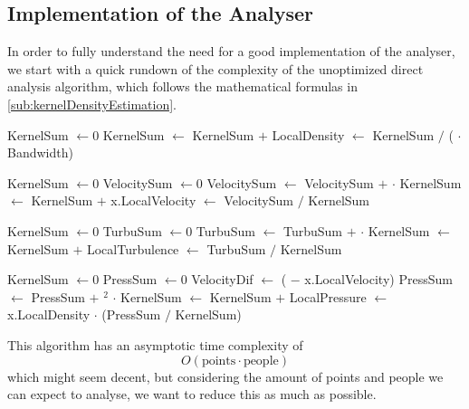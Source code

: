 \subsection{Implementation of the Analyser}\label{s3:analyser_implementation}

In order to fully understand the need for a good implementation of the analyser, we start with a quick rundown of the complexity of the unoptimized direct analysis algorithm, which follows the mathematical formulas in \cref{sub:kernelDensityEstimation}.

\begin{algorithmic}[1]

    \State KernelSum $\gets 0$
        \State KernelSum $\gets$ KernelSum $+$ 
    \EndFor
    \State LocalDensity $\gets$ KernelSum $/$ ( $\cdot$ Bandwidth)
\EndFor

    \State KernelSum $\gets 0$
    \State VelocitySum $\gets 0$
        \State VelocitySum $\gets$ VelocitySum $+$  $\cdot$ 
        \State KernelSum $\gets$ KernelSum $+$ 
    \EndFor
    \State x.LocalVelocity $\gets$ VelocitySum $/$ KernelSum
\EndFor

    \State KernelSum $\gets 0$
    \State TurbuSum $\gets 0$
        \State TurbuSum $\gets$ TurbuSum $+$  $\cdot$ 
        \State KernelSum $\gets$ KernelSum $+$ 
    \EndFor
    \State LocalTurbulence $\gets$ TurbuSum $/$ KernelSum
\EndFor

    \State KernelSum $\gets 0$
    \State PressSum $\gets 0$
        \State VelocityDif $\gets$ ( $-$ x.LocalVelocity)
        \State PressSum $\gets$ PressSum $+$ $^2$ $\cdot$ 
        \State KernelSum $\gets$ KernelSum $+$ 
    \EndFor
    \State LocalPressure $\gets$ x.LocalDensity $\cdot$ (PressSum $/$ KernelSum)
\EndFor
\EndFunction
\end{algorithmic}

This algorithm has an asymptotic time complexity of $$O(\text{points} \cdot \text{people})$$ which might seem decent, but considering the amount of points and people we can expect to analyse, we want to reduce this as much as possible.

